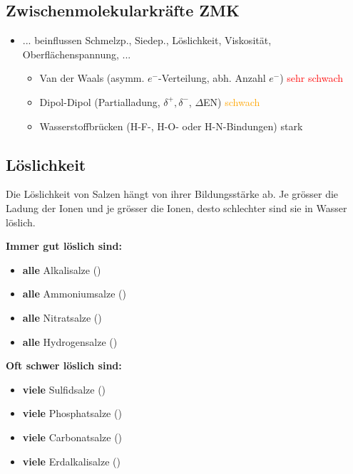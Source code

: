 \subsection{Zwischenmolekularkräfte ZMK}
    \begin{itemize}
        \item ... beinflussen Schmelzp., Siedep., Löslichkeit, Viskosität, Oberflächenspannung, ...
        \begin{itemize}
            \item Van der Waals (asymm. $e^-$-Verteilung, abh. Anzahl $e^-$) \textcolor{red}{sehr schwach}
            \item Dipol-Dipol (Partialladung, $\delta^+, \delta^-$, $\Delta$EN) \textcolor{orange}{schwach}
            \item Wasserstoffbrücken (H-F-, H-O- oder H-N-Bindungen) \textcolor{green!80!black}{stark}
        \end{itemize}
    \end{itemize}

\subsection{Löslichkeit}
    Die Löslichkeit von Salzen hängt von ihrer Bildungsstärke ab. Je grösser die Ladung der Ionen und je grösser die Ionen, desto schlechter sind sie in Wasser löslich.
    
    \begin{minipage}{0.49\columnwidth}
        \textbf{Immer gut löslich sind:}
        \begin{itemize}
            \item \textbf{alle} Alkalisalze ()
            \item \textbf{alle} Ammoniumsalze ()
            \item \textbf{alle} Nitratsalze ()
            \item \textbf{alle} Hydrogensalze ()
        \end{itemize}
    \end{minipage}
    \hfill
    \begin{minipage}{0.49\columnwidth}
        \textbf{Oft schwer löslich sind:}
        \begin{itemize}
            \item \textbf{viele} Sulfidsalze ()
            \item \textbf{viele} Phosphatsalze ()
            \item \textbf{viele} Carbonatsalze ()
            \item \textbf{viele} Erdalkalisalze ()
        \end{itemize}
    \end{minipage}